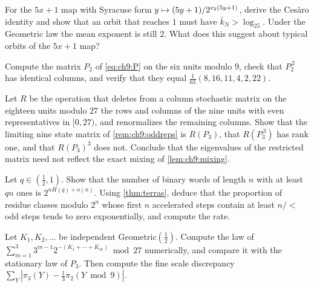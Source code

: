 \begin{exercise}\label{ex:ch9:fivex}
For the $5x+1$ map with Syracuse form $y\mapsto(5y+1)/2^{v_2(5y+1)}$, derive
the Ces\`aro identity and show that an orbit that reaches $1$ must have
$\bar k_N>\log_25$. Under the Geometric law the mean exponent is still $2$.
What does this suggest about typical orbits of the $5x+1$ map?
\end{exercise}

\begin{exercise}\label{ex:ch9:mod9}
Compute the matrix $P_2$ of \eqref{eq:ch9:P} on the six units modulo $9$, check
that $P_2^{\,2}$ has identical columns, and verify that they equal
$\tfrac1{63}(8,16,11,4,2,22)$.
\end{exercise}

\begin{exercise}\label{ex:ch9:restricted}
Let $R$ be the operation that deletes from a column stochastic matrix on the
eighteen units modulo $27$ the rows and columns of the nine units with even
representatives in $[0,27)$, and renormalizes the remaining columns. Show that
the limiting nine state matrix of \cref{rem:ch9:oddreps} is $R(P_3)$, that
$R(P_3^{\,3})$ has rank one, and that $R(P_3)^3$ does not. Conclude that the
eigenvalues of the restricted matrix need not reflect the exact mixing of
\cref{lem:ch9:mixing}.
\end{exercise}

\begin{exercise}\label{ex:ch9:entropy}
Let $q\in(\tfrac12,1)$. Show that the number of binary words of length $n$ with
at least $qn$ ones is $2^{nH(q)+o(n)}$. Using \cref{thm:terras}, deduce that the
proportion of residue classes modulo $2^n$ whose first $n$ accelerated steps
contain at least $n/\lt$ odd steps tends to zero exponentially, and compute
the rate.
\end{exercise}

\begin{exercise}\label{ex:ch9:tao}
Let $K_1,K_2,\ldots$ be independent Geometric$(\tfrac12)$. Compute the law of
$\sum_{m=1}^{3}3^{m-1}2^{-(K_1+\cdots+K_m)}\bmod27$ numerically, and compare it
with the stationary law of $P_3$. Then compute the fine scale discrepancy
$\sum_Y|\pi_3(Y)-\tfrac13\pi_2(Y\bmod9)|$.
\end{exercise}
